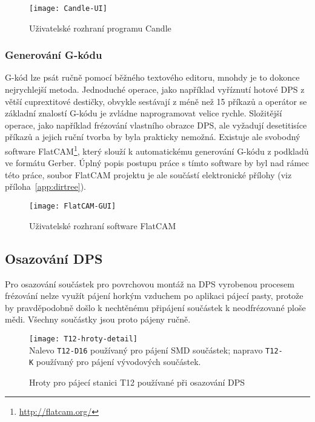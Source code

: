 \begin{figure}[htbp]
    \centering
    \texttt{[image: Candle-UI]}
    \caption{Uživatelské rozhraní programu Candle}
    \label{fig:CNC Candle}
\end{figure}


\subsubsection{Generování G-kódu}
G-kód lze psát ručně pomocí běžného textového editoru, mnohdy je to dokonce
nejrychlejší metoda. Jednoduché operace, jako například vyříznutí hotové DPS
z větší cuprextitové destičky, obvykle sestávají z méně než 15 příkazů
a operátor se základní znalostí G-kódu je zvládne naprogramovat velice rychle.
Složitější operace, jako například frézování vlastního obrazce DPS, ale
vyžadují desetitisíce příkazů a jejich ruční tvorba by byla prakticky nemožná.
Existuje ale svobodný software FlatCAM\footnote{\url{http://flatcam.org/}},
který slouží k automatickému generování G-kódu z podkladů ve formátu Gerber.
Úplný popis postupu práce s tímto software by byl nad rámec této práce, soubor
FlatCAM projektu je ale součástí elektronické přílohy (viz
příloha~\vref{app:dirtree}).

\begin{figure}[htbp]
    \centering
    \texttt{[image: FlatCAM-GUI]}
    \caption{Uživatelské rozhraní software FlatCAM}
    \label{fig:CNC FlatCAM}
\end{figure}


\subsection{Osazování DPS}
Pro osazování součástek pro povrchovou montáž na DPS vyrobenou procesem
frézování nelze využít pájení horkým vzduchem po aplikaci pájecí pasty, protože
by pravděpodobně došlo k nechtěnému připájení součástek k neodfrézované ploše
mědi. Všechny součástky jsou proto pájeny ručně.

\begin{figure}[htb]
    \centering
    \texttt{[image: T12-hroty-detail]}
    \\
    {\footnotesize Nalevo \texttt{T12-D16} používaný pro pájení SMD součástek;
    napravo \texttt{T12-K} používaný pro pájení vývodových součástek.}
    \caption{Hroty pro pájecí stanici T12 používané při osazování DPS}
    \label{fig:PCB pajecka hroty}
\end{figure}

